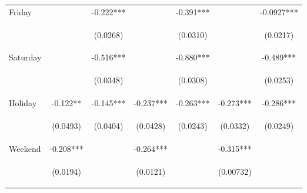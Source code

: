 \begin{center}
\begin{tabular}{lcccccc}
Friday &  & -0.222*** &  & -0.391*** &  & -0.0927*** \\
\vspace{4pt} &  & \begin{footnotesize}(0.0268)\end{footnotesize} &  & \begin{footnotesize}(0.0310)\end{footnotesize} &  & \begin{footnotesize}(0.0217)\end{footnotesize} \\
Saturday &  & -0.516*** &  & -0.880*** &  & -0.489*** \\
\vspace{4pt} &  & \begin{footnotesize}(0.0348)\end{footnotesize} &  & \begin{footnotesize}(0.0308)\end{footnotesize} &  & \begin{footnotesize}(0.0253)\end{footnotesize} \\
Holiday & -0.122** & -0.145*** & -0.237*** & -0.263*** & -0.273*** & -0.286*** \\
\vspace{4pt} & \begin{footnotesize}(0.0493)\end{footnotesize} & \begin{footnotesize}(0.0404)\end{footnotesize} & \begin{footnotesize}(0.0428)\end{footnotesize} & \begin{footnotesize}(0.0243)\end{footnotesize} & \begin{footnotesize}(0.0332)\end{footnotesize} & \begin{footnotesize}(0.0249)\end{footnotesize} \\
Weekend & -0.208*** &  & -0.264*** &  & -0.315*** &  \\
 & \begin{footnotesize}(0.0194)\end{footnotesize} &  & \begin{footnotesize}(0.0121)\end{footnotesize} &  & \begin{footnotesize}(0.00732)\end{footnotesize} &  \\

\end{tabular}
\end{center}
